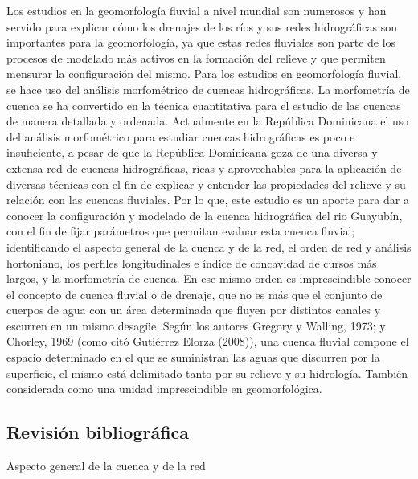 \documentclass[11pt,]{article}
\begin{document}
Los estudios en la geomorfología fluvial a nivel mundial son numerosos y
han servido para explicar cómo los drenajes de los ríos y sus redes
hidrográficas son importantes para la geomorfología, ya que estas redes
fluviales son parte de los procesos de modelado más activos en la
formación del relieve y que permiten mensurar la configuración del
mismo. Para los estudios en geomorfología fluvial, se hace uso del
análisis morfométrico de cuencas hidrográficas. La morfometría de cuenca
se ha convertido en la técnica cuantitativa para el estudio de las
cuencas de manera detallada y ordenada. Actualmente en la República
Dominicana el uso del análisis morfométrico para estudiar cuencas
hidrográficas es poco e insuficiente, a pesar de que la República
Dominicana goza de una diversa y extensa red de cuencas hidrográficas,
ricas y aprovechables para la aplicación de diversas técnicas con el fin
de explicar y entender las propiedades del relieve y su relación con las
cuencas fluviales. Por lo que, este estudio es un aporte para dar a
conocer la configuración y modelado de la cuenca hidrográfica del rio
Guayubín, con el fin de fijar parámetros que permitan evaluar esta
cuenca fluvial; identificando el aspecto general de la cuenca y de la
red, el orden de red y análisis hortoniano, los perfiles longitudinales
e índice de concavidad de cursos más largos, y la morfometría de cuenca.
En ese mismo orden es imprescindible conocer el concepto de cuenca
fluvial o de drenaje, que no es más que el conjunto de cuerpos de agua
con un área determinada que fluyen por distintos canales y escurren en
un mismo desagüe. Según los autores Gregory y Walling, 1973; y Chorley,
1969 (como citó Gutiérrez Elorza (2008)), una cuenca fluvial compone el
espacio determinado en el que se suministran las aguas que discurren por
la superficie, el mismo está delimitado tanto por su relieve y su
hidrología. También considerada como una unidad imprescindible en
geomorfológica.

\subsection{Revisión bibliográfica}\label{revisiuxf3n-bibliogruxe1fica}

Aspecto general de la cuenca y de la red
\end{document}
